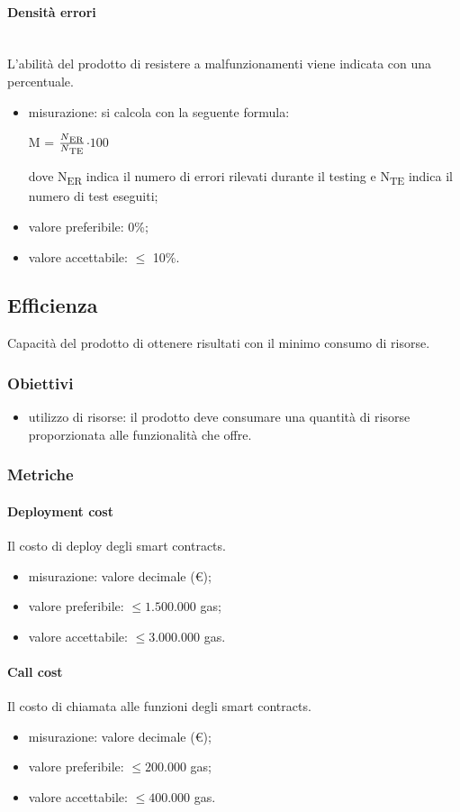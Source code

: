 			\paragraph{Densità errori}\mbox{}\\
			L'abilità del prodotto di resistere a malfunzionamenti viene indicata con una percentuale.
			\begin{itemize}
			\item misurazione: si calcola con la seguente formula: \\
			\centerline{ M =  \(\frac{N\textsubscript{ER}}{N\textsubscript{TE}} \)$ \cdot 100$ }
			dove N\textsubscript{ER} indica il numero di errori rilevati durante il testing e N\textsubscript{TE} indica il numero di test eseguiti;
			\item valore preferibile: 0\%;
			\item valore accettabile: $\leq$ 10\%.
			\end{itemize}
	\subsection{Efficienza}
	Capacità del prodotto di ottenere risultati con il minimo consumo di risorse.
		\subsubsection{Obiettivi}
		\begin{itemize}
			\item utilizzo di risorse: il prodotto deve consumare una quantità di risorse proporzionata alle funzionalità che offre.
		\end{itemize}
		\subsubsection{Metriche}
			\paragraph{Deployment cost}
			Il costo di deploy degli smart contracts\glosp.
			\begin{itemize}
				\item misurazione: valore decimale (\euro);
				\item valore preferibile: $ \leq 1.500.000$ gas;
				\item valore accettabile: $ \leq 3.000.000$ gas.
			\end{itemize}
			\paragraph{Call cost}
			Il costo di chiamata alle funzioni degli smart contracts\glosp.
			\begin{itemize}
				\item misurazione: valore decimale (\euro);
				\item valore preferibile: $ \leq 200.000$ gas;
				\item valore accettabile: $ \leq 400.000$ gas.
			\end{itemize}
	
